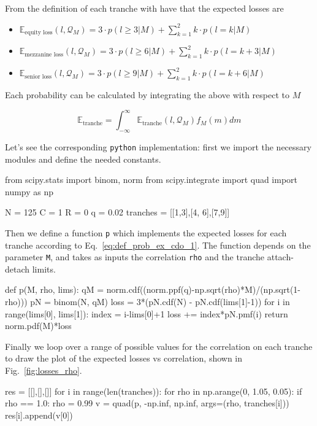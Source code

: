 From the definition of each tranche with have that the expected losses are
\begin{itemize}
	\item $\mathbb{E}_{\textrm{equity loss}}(l, \mathcal{Q}_M)=3\cdot p(l\ge 3|M) + \sum_{k=1}^{2}k\cdot p(l=k|M)$
	\item $\mathbb{E}_{\textrm{mezzanine loss}}(l, \mathcal{Q}_M)=3\cdot p(l\ge 6|M) + \sum_{k=1}^{2}k\cdot p(l=k+3|M)$
	\item $\mathbb{E}_{\textrm{senior loss}}(l, \mathcal{Q}_M)=3\cdot p(l\ge 9|M) + \sum_{k=1}^{2}k\cdot p(l=k+6|M)$
\end{itemize}
	
Each probability can be calculated by integrating the above with respect to $M$
	
\begin{equation} 
\mathbb{E}_{\mathrm{tranche}} = \int_{-\infty}^{\infty}{\mathbb{E}_{\mathrm{tranche}}(l, \mathcal{Q}_M) f_M(m)dm}
\end{equation}

Let's see the corresponding \texttt{python} implementation: first we import the necessary modules and define the needed constants.

\begin{ipython}
from scipy.stats import binom, norm
from scipy.integrate import quad
import numpy as np

N = 125
C = 1
R = 0
q = 0.02
tranches = [[1,3],[4, 6],[7,9]]
\end{ipython}

Then we define a function \texttt{p} which implements the expected losses for each tranche according to Eq.~\ref{eq:def_prob_ex_cdo_1}.
The function depends on the parameter \texttt{M}, and takes as inputs the correlation \texttt{rho} and the tranche attach-detach limits.
	
\begin{ipython}
def p(M, rho, lims):
    qM = norm.cdf((norm.ppf(q)-np.sqrt(rho)*M)/(np.sqrt(1-rho)))
    pN = binom(N, qM)
    loss = 3*(pN.cdf(N) - pN.cdf(lims[1]-1))
    for i in range(lims[0], lims[1]):
        index = i-lims[0]+1
        loss += index*pN.pmf(i)
    return norm.pdf(M)*loss
\end{ipython}

Finally we loop over a range of possible values for the correlation on each tranche to draw the plot of the expected losses vs correlation, shown in Fig.~\ref{fig:losses_rho}.

\begin{ipython}
res = [[],[],[]]
for i in range(len(tranches)):
    for rho in np.arange(0, 1.05, 0.05):
        if rho == 1.0:
            rho = 0.99
        v = quad(p, -np.inf, np.inf, args=(rho, tranches[i]))
        res[i].append(v[0])
\end{ipython}

